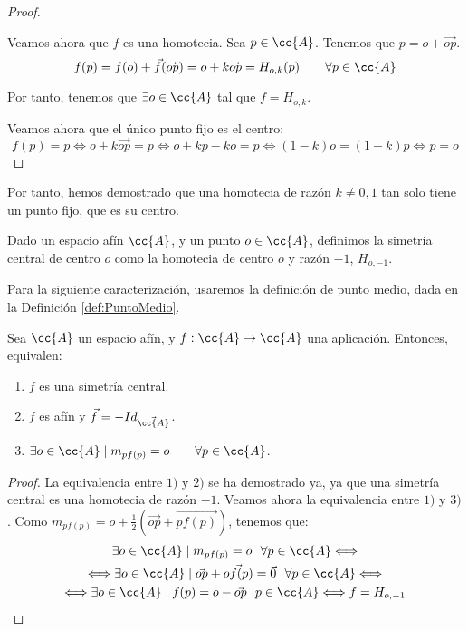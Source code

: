 \begin{proof}
\begin{description}
        Veamos ahora que $f$ es una homotecia. Sea $p\in \cc{A}$. Tenemos que $p=o+\vec{op}$.
        \begin{equation*}
            f(p) = f(o)+\vec{f}(\vec{op}) = o+k\vec{op} = H_{o,k}(p) \qquad \forall p\in \cc{A}
        \end{equation*}

        Por tanto, tenemos que $\exists o\in \cc{A}$ tal que $f=H_{o,k}$.
    \end{description}\vspace{1cm}
    
    Veamos ahora que el único punto fijo es el centro:
    \begin{equation*}
        f(p)=p \Longleftrightarrow o+k\vec{op} = p \Longleftrightarrow o+kp-ko = p \Longleftrightarrow (1-k)o = (1-k)p \Longleftrightarrow p=o
    \end{equation*}
\end{proof}
Por tanto, hemos demostrado que una homotecia de razón $k\neq 0,1$ tan solo tiene un punto fijo, que es su centro.

\begin{definicion}
    Dado un espacio afín $\cc{A}$, y un punto $o\in \cc{A}$, definimos la simetría central de centro $o$ como la homotecia de centro $o$ y razón $-1$, $H_{o,-1}$.
\end{definicion}

Para la siguiente caracterización, usaremos la definición de punto medio, dada en la Definición \ref{def:PuntoMedio}.
\begin{prop}
    Sea $\cc{A}$ un espacio afín, y $f:\cc{A}\to \cc{A}$ una aplicación. Entonces, equivalen:
    \begin{enumerate}
        \item $f$ es una simetría central.
        \item $f$ es afín y $\vec{f}=-Id_{\vec{\cc{A}}}$.
        \item $\exists o\in \cc{A}\mid m_{pf(p)}=o \qquad \forall p\in \cc{A}$.
    \end{enumerate}
\end{prop}
\begin{proof}
    La equivalencia entre $1)$ y $2)$ se ha demostrado ya, ya que una simetría central es una homotecia de razón $-1$.
    Veamos ahora la equivalencia entre $1)$ y $3)$. Como $m_{pf(p)}= o + \frac{1}{2}\left(\vec{op} + \vec{pf(p)}\right)$, tenemos que:
    \begin{multline*}
        \exists o\in \cc{A}\mid m_{pf(p)}=o ~~ \forall p\in \cc{A} \Longleftrightarrow \\ \Longleftrightarrow
        \exists o\in \cc{A}\mid \vec{op}+\vec{of(p)} = \vec{0} ~~ \forall p\in \cc{A} \Longleftrightarrow \\ \Longleftrightarrow
        \exists o\in \cc{A}\mid f(p) = o - \vec{op} ~~ p\in \cc{A} \Longleftrightarrow 
        f = H_{o,-1}
    \end{multline*}
\end{proof}


